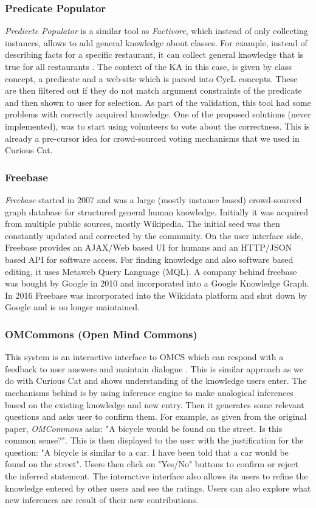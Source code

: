 \subsubsection{Predicate Populator} 
\emph{Predicete Populator} is a similar tool as \emph{Factivore}, which instead
of only collecting instances, allows to add general knowledge about classes. For
example, instead of describing facts for a specific restaurant, it can collect
general knowledge that is true for all restaurants \parencite{Witbrock2005}. The
context of the KA in this case, is given by class concept, a predicate and a 
web-site which is parsed into CycL concepts. These are then filtered out if they
do not match argument constraints of the predicate and then shown to user for 
selection. As part of the validation, this tool had some problems with correctly
acquired knowledge. One of the proposed solutions (never implemented), was to
start using volunteers to vote about the correctness. This is already a 
pre-cursor idea for crowd-sourced voting mechanisms that we used in Curious Cat.

\subsubsection{Freebase} 
\emph{Freebase} started in 2007\parencite{Bollacker2008} and was a large (mostly
instance based) crowd-sourced graph database for structured general human 
knowledge. Initially it was acquired from multiple public sources, mostly 
Wikipedia. The initial seed was then constantly updated and corrected by the 
community. On the user interface side, Freebase provides an AJAX/Web based 
UI for humans and an HTTP/JSON based API for software access. For finding
knowledge and also software based editing, it uses Metaweb Query Language 
(MQL). A company behind freebase was bought by Google in 2010 and incorporated
into a Google Knowledge Graph. In 2016 Freebase was incorporated into the 
Wikidata platform and shut down by Google and is no longer maintained.

\subsubsection{OMCommons (Open Mind Commons)} 
This system is an interactive interface to OMCS which
can respond with a feedback to user answers and maintain dialogue 
\parencite{Speer2007}. This is similar approach as we do with Curious Cat and
shows understanding of the knowledge users enter. The mechanisms behind is
by using inference engine to make analogical inferences based on the existing 
knowledge and new entry. Then it generates some relevant questions and asks 
user to confirm them. For example, as given from the original paper, 
\emph{OMCommons} asks: "A bicycle would be found on the street. Is this common 
sense?". This is then displayed to the user with the justification for the 
question: "A bicycle is similar to a car. I have been told that a car would 
be found on the street". Users then click on "Yes/No" buttons to confirm or
reject the inferred statement. The interactive interface also allows its users 
to refine the knowledge entered by other users and see the ratings. Users can 
also explore what new inferences are result of their new contributions.

